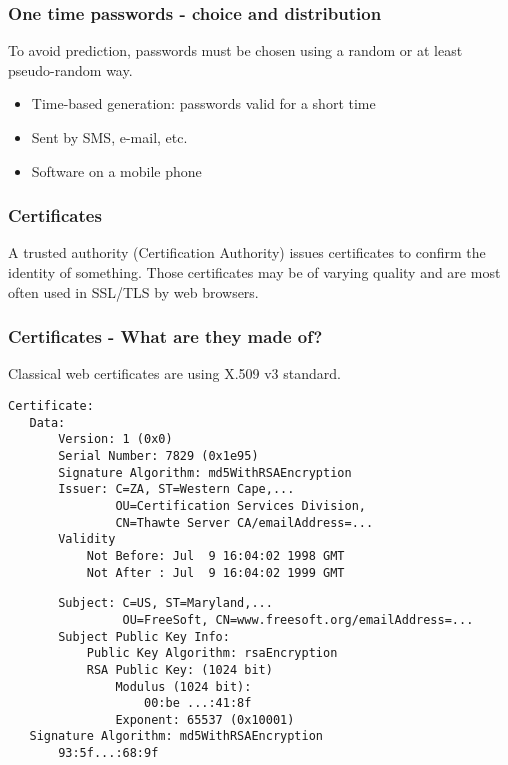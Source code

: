 \begin{frame}
\frametitle{One time passwords - choice and distribution}
To avoid prediction, passwords must be chosen using a random or at
least pseudo-random way.
\begin{itemize}
\item Time-based generation: passwords valid for a short time
\item Sent by SMS, e-mail, etc.
\item Software on a mobile phone
\end{itemize}
\end{frame}

\begin{frame}
\frametitle{Certificates}
A trusted authority (Certification Authority) issues certificates to
confirm the identity of something. Those certificates may be of varying
quality and are most often used in SSL/TLS by web browsers.
\end{frame}

\begin{frame}[fragile]
\frametitle{Certificates - What are they made of?}
Classical web certificates are using X.509 v3 standard.
\begin{lstlisting}
Certificate:
   Data:
       Version: 1 (0x0)
       Serial Number: 7829 (0x1e95)
       Signature Algorithm: md5WithRSAEncryption
       Issuer: C=ZA, ST=Western Cape,...
               OU=Certification Services Division,
               CN=Thawte Server CA/emailAddress=...
       Validity
           Not Before: Jul  9 16:04:02 1998 GMT
           Not After : Jul  9 16:04:02 1999 GMT
\end{lstlisting}
\end{frame}
\begin{frame}[fragile]
\begin{lstlisting}
       Subject: C=US, ST=Maryland,...
                OU=FreeSoft, CN=www.freesoft.org/emailAddress=...
       Subject Public Key Info:
           Public Key Algorithm: rsaEncryption
           RSA Public Key: (1024 bit)
               Modulus (1024 bit):
                   00:be ...:41:8f
               Exponent: 65537 (0x10001)
   Signature Algorithm: md5WithRSAEncryption
       93:5f...:68:9f
\end{lstlisting}
\end{frame}

